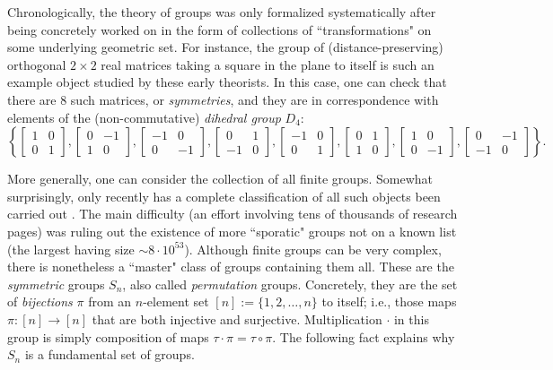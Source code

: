 \documentclass[letterpaper, 10pt]{article}
\theoremstyle{definition}
\begin{document}
Chronologically, the theory of groups was only formalized systematically after being concretely worked on in the form of collections of ``transformations" on some underlying geometric set.  For instance, the group of (distance-preserving) orthogonal $2 \times 2$ real matrices taking a square in the plane to itself is such an example object studied by these early theorists.  In this case, one can check that there are $8$ such matrices, or \textit{symmetries}, and they are in correspondence with elements of the (non-commutative) \textit{dihedral group} $D_4$:
\[ \left\{\left[\begin{array}{cc}1 & 0 \\0 & 1\end{array}\right], \left[\begin{array}{cc}0 & -1 \\ 1 & 0\end{array}\right],
\left[\begin{array}{cc}-1 & 0 \\0 & -1\end{array}\right],\left[\begin{array}{cc}0 & 1 \\-1 & 0\end{array}\right],
\left[\begin{array}{cc}-1 & 0 \\0 & 1\end{array}\right],\left[\begin{array}{cc}0 & 1 \\1 & 0\end{array}\right],
\left[\begin{array}{cc}1 & 0 \\0 & -1\end{array}\right],\left[\begin{array}{cc}0 & -1 \\-1 & 0\end{array}\right] \right\}.\]

More generally, one can consider the collection of all finite groups.  Somewhat surprisingly, only recently has a complete classification of all such objects been carried out \cite{gorenstein2013finite}.  The main difficulty (an effort involving tens of thousands of research pages) was ruling out the existence of more ``sporatic" groups not on a known list (the largest having size $\sim 8 \cdot 10^{53}$).  Although finite groups can be very complex, there is nonetheless a ``master" class of groups containing them all.  These are the \textit{symmetric} groups $S_n$, also called \textit{permutation} groups.  Concretely, they are the set of \textit{bijections} $\pi$ from an $n$-element set $[n] := \{1, 2, \ldots, n\}$ to itself; i.e., those maps $\pi: [n] \to [n]$ that are both injective and surjective.  Multiplication $\cdot$ in this group is simply composition of maps $\tau \cdot \pi = \tau \circ \pi$.  The following fact explains why $S_n$ is a fundamental set of groups.
\end{document}
